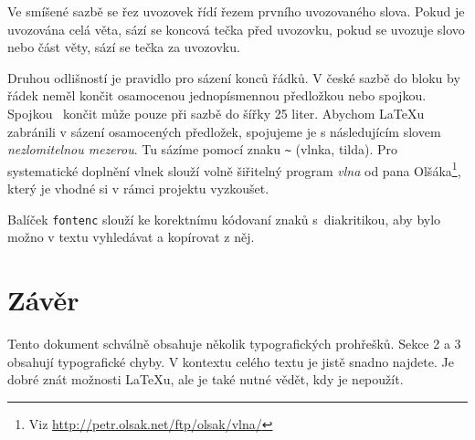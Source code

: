 \documentclass[twocolumn, 10pt, a4paper]{article} %
\begin{document}
    Ve smíšené sazbě se řez uvozovek řídí řezem prvního uvozovaného slova.
    Pokud je uvozována celá věta, sází se koncová tečka před uvozovku, pokud se uvozuje slovo nebo část věty, sází se tečka za uvozovku.
    \par
    
    Druhou odlišností je pravidlo pro sázení konců řádků.
    V české sazbě do bloku by řádek neměl končit osamo\-cenou jednopísmennou předložkou nebo spojkou.
    Spojkou ~končit může pouze při sazbě do šířky 25 liter.
    Abychom \LaTeX u zabránili v sázení osamocených předložek, spojujeme je s následujícím slovem \emph{nezlomitelnou mezerou}.
    Tu sázíme pomocí znaku \verb|~| (vlnka, tilda).
    Pro systematické doplnění vlnek slouží volně šiřitelný program \emph{vlna} od pana Olšáka\footnote{Viz \url{http://petr.olsak.net/ftp/olsak/vlna/}}, který je vhodné si v rámci projektu vyzkoušet.
    \par
    
    Balíček \texttt{fontenc} slouží ke korektnímu kódovaní znaků s~diakritikou, aby bylo možno v textu vyhledávat a kopírovat z něj.
    

\section{Závěr}
Tento dokument schválně obsahuje několik typografických prohřešků.
Sekce 2 a 3 obsahují typografické chyby.
V kontextu celého textu je jistě snadno najdete.
Je dobré znát možnosti \LaTeX u, ale je také nutné vědět, kdy je nepoužít.
\end{document}
